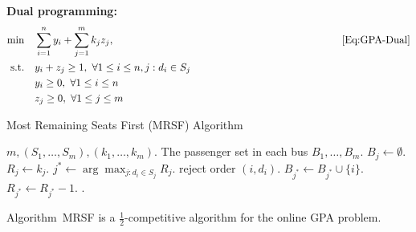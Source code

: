 {\bf Dual programming:}
\begin{subequations}\label{Eq:GPA-Dual}
\centering
\begin{align}
	\min & \quad \sum_{i = 1}^n y_i + \sum_{j = 1}^m k_j z_j, \quad\quad\quad\quad\quad\quad\quad\quad\quad\quad\quad\quad\quad\quad\quad\quad\quad\quad\quad\quad\quad\quad\eqref{Eq:GPA-Dual}\notag\\
	\text{s.t.} & \quad y_i + z_j \ge 1, \ \forall 1 \le i \le n, j : d_i \in S_j \label{Eq:GPA-Dual-Constr-Cover} \\
    & \quad y_i \ge 0 , \ \forall 1 \le i \le n\label{Eq:GPA-Dual-Constr-Y} \\
    & \quad z_j \ge 0 , \ \forall 1 \le j \le m\label{Eq:GPA-Dual-Constr-Z}
\end{align}
\end{subequations}

\begin{algorithm}[h]
\caption{Most Remaining Seats First (MRSF) Algorithm}
\label{alg:MRSF}
\begin{algorithmic}[1]\small
\renewcommand{\algorithmicrequire}{\textbf{Input:}}
\renewcommand{\algorithmicensure}{\textbf{Output:}}
\renewcommand{\algorithmicprint}{\textbf{Initialization:}}
\REQUIRE $m, (S_1, \ldots, S_m), (k_1, \ldots, k_m)$.
\ENSURE The passenger set in each bus $B_1, \ldots, B_m$.
    \STATE $B_j \gets \emptyset$.
    \STATE $R_j \gets k_j$.
\ENDFOR
{}
    \STATE $j^* \gets \arg \max_{j:d_i \in S_j} R_j$.
        \STATE reject order $(i, d_i)$.
    \ELSE
        \STATE $B_{j^*} \gets B_{j^*} \cup \{i\}$.
        \STATE $R_{j^*} \gets R_{j^*} - 1$.
    \ENDIF
\ENDWHILE
{}.
\end{algorithmic}
\end{algorithm}
\vspace{-0em}

\begin{theorem}\label{theorem:MRSF}
Algorithm~MRSF is a $\frac{1}{2}$-competitive algorithm for the online GPA problem.
\end{theorem}

